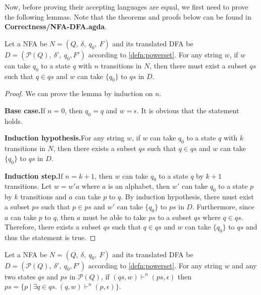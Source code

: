 \par Now, before proving their accepting languages are equal, we first
need to prove the following lemmas. Note that the theorems and proofs below can be found in
\textbf{Correctness/NFA-DFA.agda}. 

\begin{lem}
\label{lem:nfa<dfa}
\noindent Let a NFA be \(N = (Q,\ \delta,\ q_0,\ F)\) and its
translated DFA be \(D = (\mathcal P \left({Q}\right),\ \delta',\ {q_0},
F')\) according to \autoref{defn:powerset}. For any string \(w\), if \(w\) can take \(q_0\) to a state
\(q\) with \(n\) transitions in \(N\), then there must exist a subset \(qs\) such that \(q
\in qs\) and \(w\) can take \(\{q_0\}\) to \(qs\) in \(D\). 
\end{lem}

\begin{proof}
\noindent We can prove the lemma by induction on \(n\).
\par \noindent \textbf{Base case.}\quad If \(n = 0\), then \(q_0 = q\)
and \(w = \epsilon\). It is obvious that the statement holds.

\par \noindent \textbf{Induction hypothesis.}\quad For any string \(w\), if \(w\) can take \(q_0\) to a state
\(q\) with \(k\) transitions in \(N\), then there exists a subset \(qs\) such that \(q
\in qs\) and \(w\) can take \(\{q_0\}\) to \(qs\) in \(D\). 

\par \noindent \textbf{Induction step.}\quad If \(n = k + 1\), then
\(w\) can take \(q_0\) to a state \(q\) by \(k + 1\) transitions. Let
\(w = w'a\) where \(a\) is an alphabet, then \(w'\) can take \(q_0\)
to a state \(p\) by \(k\) transitions and \(a\) can take \(p\) to
\(q\). By induction hypothesis, there must exist a subset \(ps\) such that \(p
\in ps\) and \(w'\) can take \(\{q_0\}\) to \(ps\) in \(D\). Furthermore, since \(a\) can take \(p\) to \(q\), then \(a\) must be
able to take \(ps\) to a subset \(qs\) where \(q \in qs\). Therefore,
there exists a subset \(qs\) such that \(q \in qs\) and \(w\) can take
\(\{q_0\}\) to \(qs\) and thus the statement is true. 
\end{proof}


\begin{lem}
\label{lem:nfa>dfa}
\noindent Let a NFA be \(N = (Q,\ \delta,\ q_0,\ F)\) and its
translated DFA be \(D = (\mathcal P \left({Q}\right),\ \delta',\ {q_0},
F')\) according to \autoref{defn:powerset}. For any string \(w\) and any
two states \(qs\) and \(ps\) in \(\mathcal P \left({Q}\right)\), if
\((qs,w) \vdash^n (ps,\epsilon)\) then \(ps =
\{p\ |\ \exists q\in qs.\ (q,w) \vdash^n (p,\epsilon)\}\). 
\end{lem}

